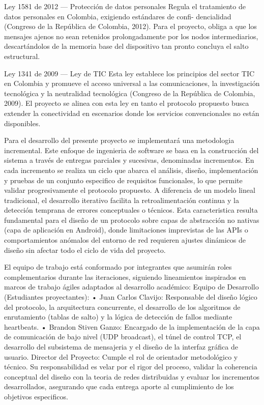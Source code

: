 Ley 1581 de 2012 --- Protección de datos personales Regula el tratamiento de datos personales en Colombia, exigiendo estándares de confi- dencialidad (Congreso de la República de Colombia, 2012). Para el proyecto, obliga a que los mensajes ajenos no sean retenidos prolongadamente por los nodos intermediarios, descartándolos de la memoria base del dispositivo tan pronto concluya el salto estructural.

Ley 1341 de 2009 --- Ley de TIC Esta ley establece los principios del sector TIC en Colombia y promueve el acceso universal a las comunicaciones, la investigación tecnológica y la neutralidad tecnológica (Congreso de la República de Colombia, 2009). El proyecto se alinea con esta ley en tanto el protocolo propuesto busca extender la conectividad en escenarios donde los servicios convencionales no están disponibles.

\newpage
{}

Para el desarrollo del presente proyecto se implementará una metodologia incremental. Este enfoque de ingenieria de software se basa en la construcción del sistema a través de entregas parciales y sucesivas, denominadas incrementos. En cada incremento se realiza un ciclo que abarca el análisis, diseño, implementación y pruebas de un conjunto especifico de requisitos funcionales, lo que permite validar progresivamente el protocolo propuesto. A diferencia de un modelo lineal tradicional, el desarrollo iterativo facilita la retroalimentación continua y la detección temprana de errores conceptuales o técnicos. Esta caracteristica resulta fundamental para el diseño de un protocolo sobre capas de abstracción no nativas (capa de aplicación en Android), donde limitaciones imprevistas de las APIs o comportamientos anómalos del entorno de red requieren ajustes dinámicos de diseño sin afectar todo el ciclo de vida del proyecto.

El equipo de trabajo está conformado por integrantes que asumirán roles complementarios durante las iteraciones, siguiendo lineamientos inspirados en marcos de trabajo ágiles adaptados al desarrollo académico: Equipo de Desarrollo (Estudiantes proyectantes): • Juan Carlos Clavijo: Responsable del diseño lógico del protocolo, la arquitectura concurrente, el desarrollo de los algoritmos de enrutamiento (tablas de salto) y la lógica de detección de fallos mediante heartbeats. • Brandon Stiven Ganzo: Encargado de la implementación de la capa de comunicación de bajo nivel (UDP broadcast), el túnel de control TCP, el desarrollo del subsistema de mensajeria y el diseño de la interfaz gráfica de usuario. Director del Proyecto: Cumple el rol de orientador metodológico y técnico. Su responsabilidad es velar por el rigor del proceso, validar la coherencia conceptual del diseño con la teoria de redes distribuidas y evaluar los incrementos desarrollados, asegurando que cada entrega aporte al cumplimiento de los objetivos especificos.

